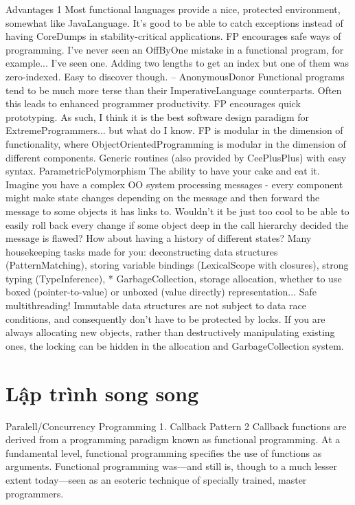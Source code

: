 Advantages 1
Most functional languages provide a nice, protected environment, somewhat like JavaLanguage. It's good to be able to catch exceptions instead of having CoreDumps in stability-critical applications.
FP encourages safe ways of programming. I've never seen an OffByOne mistake in a functional program, for example... I've seen one. Adding two lengths to get an index but one of them was zero-indexed. Easy to discover though. -- AnonymousDonor
Functional programs tend to be much more terse than their ImperativeLanguage counterparts. Often this leads to enhanced programmer productivity.
FP encourages quick prototyping. As such, I think it is the best software design paradigm for ExtremeProgrammers... but what do I know.
FP is modular in the dimension of functionality, where ObjectOrientedProgramming is modular in the dimension of different components.
Generic routines (also provided by CeePlusPlus) with easy syntax. ParametricPolymorphism
The ability to have your cake and eat it. Imagine you have a complex OO system processing messages - every component might make state changes depending on the message and then forward the message to some objects it has links to. Wouldn't it be just too cool to be able to easily roll back every change if some object deep in the call hierarchy decided the message is flawed? How about having a history of different states?
Many housekeeping tasks made for you: deconstructing data structures (PatternMatching), storing variable bindings (LexicalScope with closures), strong typing (TypeInference), * GarbageCollection, storage allocation, whether to use boxed (pointer-to-value) or unboxed (value directly) representation...
Safe multithreading! Immutable data structures are not subject to data race conditions, and consequently don't have to be protected by locks. If you are always allocating new objects, rather than destructively manipulating existing ones, the locking can be hidden in the allocation and GarbageCollection system.

\section{Lập trình song song}

Paralell/Concurrency Programming
1. Callback Pattern 2
Callback functions are derived from a programming paradigm known as functional programming. At a fundamental level, functional programming specifies the use of functions as arguments. Functional programming was—and still is, though to a much lesser extent today—seen as an esoteric technique of specially trained, master programmers.

